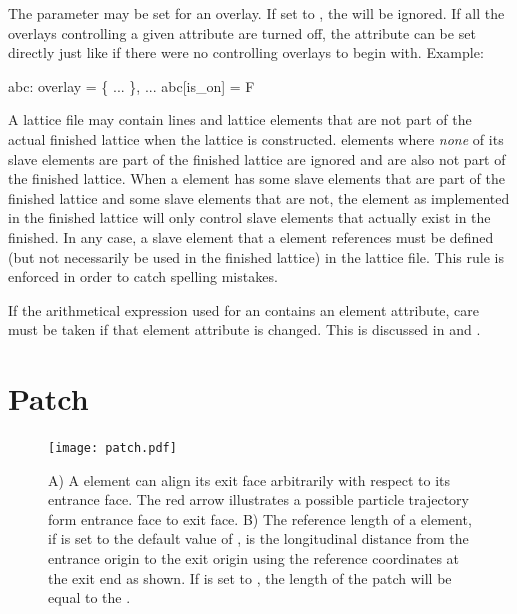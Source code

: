 {The  parameter may be set for an overlay. If set to , the  will be
ignored. If all the overlays controlling a given attribute are turned off, the attribute can be
set directly just like if there were no controlling overlays to begin with. Example:
\begin{example}
  abc: overlay = \{ ... \}, ...
  abc[is_on] = F
\end{example}

A lattice file may contain lines and lattice elements that are not part of the actual finished
lattice when the lattice is constructed.  elements where {\em none} of its slave elements
are part of the finished lattice are ignored and are also not part of the finished lattice.  When a
 element has some slave elements that are part of the finished lattice and some slave
elements that are not, the  element as implemented in the finished lattice will only
control slave elements that actually exist in the finished. In any case, a slave element that a
 element references must be defined (but not necessarily be used in the finished lattice)
in the lattice file. This rule is enforced in order to catch spelling mistakes.

If the arithmetical expression used for an  contains an element attribute, care must be
taken if that element attribute is changed. This is discussed in  and
.

\newpage

\section{Patch}
\label{s:patch}

\begin{figure}[tb]
  \centering
  \texttt{[image: patch.pdf]}
  \caption[Patch Element.]
{A) A  element can align its exit face arbitrarily with respect to its entrance face. The
red arrow illustrates a possible particle trajectory form entrance face to exit face. B) The
reference length of a  element, if  is set to the default value of
, is the longitudinal distance from the entrance origin to the exit origin using the
reference coordinates at the exit end as shown. If  is set to , the
length of the patch will be equal to the .}
  \label{f:patch}
\end{figure}

}
